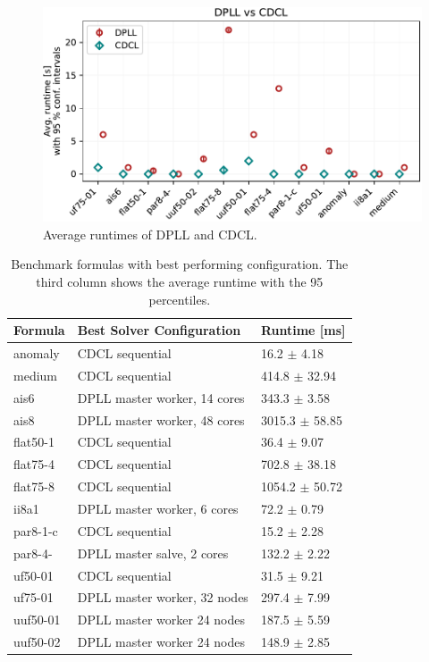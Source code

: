 \documentclass[letterpaper]{article}
\begin{document}
\begin{figure}[p]
    \centering
    \includegraphics[width=\columnwidth]{figures/dpll_vs_cdcl.pdf}
    \caption{Average runtimes of DPLL and CDCL.}
    \label{fig:dpll_vs_cdcl}
\end{figure}

\begin{table}[p]
    \centering
    \begin{tabularx}{\columnwidth}{|p{1.3cm}|X|p{2.2cm}|}
        \hline
        Formula & Best Solver Configuration & Runtime [ms]\\
        \hline
        \hline
        anomaly & CDCL sequential & 16.2 $\pm$ 4.18 \\
        \hline
        medium & CDCL sequential & 414.8 $\pm$ 32.94 \\
        \hline
        ais6 & DPLL master worker, 14 cores & 343.3 $\pm$ 3.58 \\
        \hline
        ais8 & DPLL master worker, 48 cores & 3015.3 $\pm$ 58.85 \\
        \hline
        flat50-1 & CDCL sequential & 36.4 $\pm$ 9.07 \\
        \hline
        flat75-4 & CDCL sequential & 702.8 $\pm$ 38.18 \\
        \hline
        flat75-8 & CDCL sequential & 1054.2 $\pm$ 50.72 \\
        \hline
        ii8a1 & DPLL master worker, 6 cores & 72.2 $\pm$ 0.79 \\
        \hline
        par8-1-c & CDCL sequential & 15.2 $\pm$ 2.28 \\
        \hline
        par8-4- & DPLL master salve, 2 cores & 132.2 $\pm$ 2.22 \\
        \hline
        uf50-01 & CDCL sequential & 31.5 $\pm$ 9.21 \\
        \hline
        uf75-01 & DPLL master worker, 32 nodes & 297.4 $\pm$ 7.99 \\
        \hline
        uuf50-01 & DPLL master worker 24 nodes & 187.5 $\pm$ 5.59 \\
        \hline
        uuf50-02 & DPLL master worker 24 nodes & 148.9 $\pm$ 2.85 \\
        \hline
    \end{tabularx}
    \caption{Benchmark formulas with best performing configuration.
    The third column shows the average runtime with the 95 percentiles.}
    \label{tab:cnfs_parallel}
\end{table}
\end{document}
